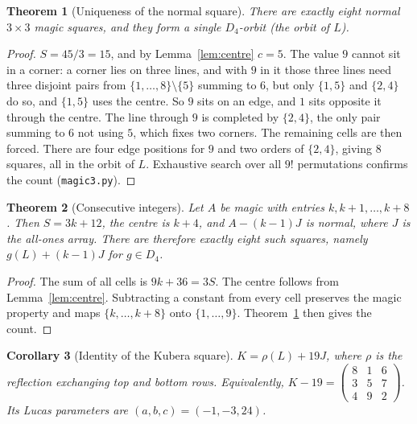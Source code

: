 \documentclass[journal]{IEEEtran}
\newtheorem{theorem}{Theorem}
\newtheorem{corollary}[theorem]{Corollary}
\theoremstyle{definition}
\newcommand{\sq}[9]{\begin{smallmatrix}#1&#2&#3\\#4&#5&#6\\#7&#8&#9\end{smallmatrix}}
\begin{document}
\begin{theorem}[Uniqueness of the normal square]\label{thm:unique}
There are exactly eight normal $3\times3$ magic squares, and they form a single $D_4$-orbit (the orbit of $L$).
\end{theorem}
\begin{proof}
$S=45/3=15$, and by Lemma~\ref{lem:centre} $c=5$. The value $9$ cannot sit in a corner: a corner lies on three lines, and with $9$ in it those three lines need three disjoint pairs from $\{1,\dots,8\}\setminus\{5\}$ summing to $6$, but only $\{1,5\}$ and $\{2,4\}$ do so, and $\{1,5\}$ uses the centre. So $9$ sits on an edge, and $1$ sits opposite it through the centre. The line through $9$ is completed by $\{2,4\}$, the only pair summing to $6$ not using $5$, which fixes two corners. The remaining cells are then forced. There are four edge positions for $9$ and two orders of $\{2,4\}$, giving $8$ squares, all in the orbit of $L$. Exhaustive search over all $9!$ permutations confirms the count (\texttt{magic3.py}).
\end{proof}

\begin{theorem}[Consecutive integers]\label{thm:consec}
Let $A$ be magic with entries $k,k+1,\dots,k+8$. Then $S=3k+12$, the centre is $k+4$, and $A-(k-1)J$ is normal, where $J$ is the all-ones array. There are therefore exactly eight such squares, namely $g(L)+(k-1)J$ for $g\in D_4$.
\end{theorem}
\begin{proof}
The sum of all cells is $9k+36=3S$. The centre follows from Lemma~\ref{lem:centre}. Subtracting a constant from every cell preserves the magic property and maps $\{k,\dots,k+8\}$ onto $\{1,\dots,9\}$. Theorem~\ref{thm:unique} then gives the count.
\end{proof}

\begin{corollary}[Identity of the Kubera square]\label{cor:K}
$K=\rho(L)+19J$, where $\rho$ is the reflection exchanging top and bottom rows. Equivalently, $K-19=\left(\sq{8}{1}{6}{3}{5}{7}{4}{9}{2}\right)$. Its Lucas parameters are $(a,b,c)=(-1,-3,24)$.
\end{corollary}
\end{document}
